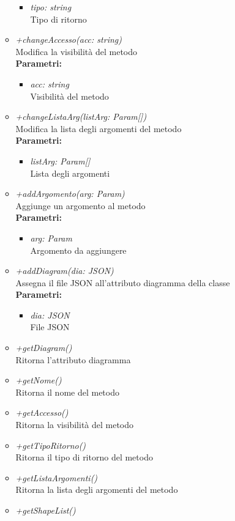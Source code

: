 \begin{itemize}
\begin{itemize}
\begin{itemize}
    			\item \emph{tipo: string}\\
    			Tipo di ritorno
    		\end{itemize}
    		\item \emph{+changeAccesso(acc: string)}\\
    		Modifica la visibilità del metodo\\
    		\textbf{Parametri:}
    		\begin{itemize}
    			\item \emph{acc: string}\\
    			Visibilità del metodo
    		\end{itemize}
    		\item \emph{+changeListaArg(listArg: Param[])}\\
    		Modifica la lista degli argomenti del metodo\\
    		\textbf{Parametri:}
    		\begin{itemize}
    			\item \emph{listArg: Param[]}\\
    			Lista degli argomenti
    		\end{itemize}
    		\item \emph{+addArgomento(arg: Param)}\\
    		Aggiunge un argomento al metodo\\
    		\textbf{Parametri:}
    		\begin{itemize}
    			\item \emph{arg: Param}\\
    			Argomento da aggiungere
    		\end{itemize}
    		\item \emph{+addDiagram(dia: JSON)}\\
    		Assegna il file JSON all'attributo diagramma della classe\\
    		\textbf{Parametri:}
    		\begin{itemize}
    			\item \emph{dia: JSON}\\
    			File JSON
    		\end{itemize}
    		\item \emph{+getDiagram()}\\
    		Ritorna l'attributo diagramma
    		\item \emph{+getNome()}\\
    		Ritorna il nome del metodo
    		\item \emph{+getAccesso()}\\
    		Ritorna la visibilità del metodo
    		\item \emph{+getTipoRitorno()}\\
    		Ritorna il tipo di ritorno del metodo
    		\item \emph{+getListaArgomenti()}\\
    		Ritorna la lista degli argomenti del metodo
    		\item \emph{+getShapeList()}\\
    		

\end{itemize}
\end{itemize}
